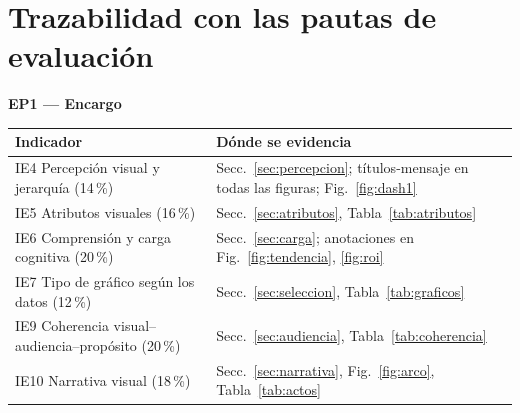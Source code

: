 \documentclass[conference,a4paper]{IEEEtran}
\begin{document}
\section{Trazabilidad con las pautas de evaluación}
\noindent\begin{minipage}{\columnwidth}\centering\footnotesize
\textbf{EP1 --- Encargo}\\[2pt]
\begin{tabularx}{\columnwidth}{@{}P{3.1cm}L@{}}
\toprule
Indicador & Dónde se evidencia\\
\midrule
IE4 Percepción visual y jerarquía (14\,\%) & Secc.~\ref{sec:percepcion}; títulos-mensaje en todas las figuras; Fig.~\ref{fig:dash1}\\
IE5 Atributos visuales (16\,\%) & Secc.~\ref{sec:atributos}, Tabla~\ref{tab:atributos}\\
IE6 Comprensión y carga cognitiva (20\,\%) & Secc.~\ref{sec:carga}; anotaciones en Fig.~\ref{fig:tendencia}, \ref{fig:roi}\\
IE7 Tipo de gráfico según los datos (12\,\%) & Secc.~\ref{sec:seleccion}, Tabla~\ref{tab:graficos}\\
IE9 Coherencia visual--audiencia--propósito (20\,\%) & Secc.~\ref{sec:audiencia}, Tabla~\ref{tab:coherencia}\\
IE10 Narrativa visual (18\,\%) & Secc.~\ref{sec:narrativa}, Fig.~\ref{fig:arco}, Tabla~\ref{tab:actos}\\
\bottomrule
\end{tabularx}
\end{minipage}\par\medskip
\end{document}
